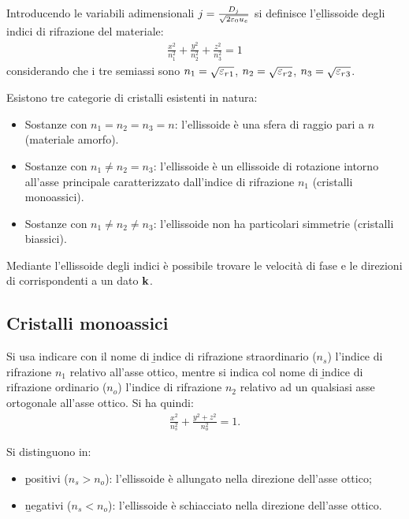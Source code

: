 Introducendo le variabili adimensionali $j=\frac{D_j}{\sqrt{2\varepsilon_0u_e}}$ si definisce l'\b{ellissoide degli indici di rifrazione del materiale}:
\begin{equation}\begin{split}
\frac{x^2}{n_1^2}+\frac{y^2}{n_2^2}+\frac{z^2}{n_3^2}=1
\end{split}\end{equation}
considerando che i tre semiassi sono $n_1=\sqrt{{\varepsilon_r}_1}$, $n_2=\sqrt{{\varepsilon_r}_2}$, $n_3=\sqrt{{\varepsilon_r}_3}$.

Esistono tre categorie di cristalli esistenti in natura:
\begin{itemize}
\item Sostanze con $n_1=n_2=n_3=n$: l'ellissoide è una sfera di raggio pari a $n$ (materiale amorfo).
\item Sostanze con $n_1\neq n_2=n_3$: l'ellissoide è un ellissoide di rotazione intorno all'asse principale caratterizzato dall'indice di rifrazione $n_1$ (cristalli monoassici).
\item Sostanze con $n_1\neq n_2\neq n_3$: l'ellissoide non ha particolari simmetrie (cristalli biassici).
\end{itemize}
Mediante l'ellissoide degli indici è possibile trovare le velocità di fase e le direzioni di \dD corrispondenti a un dato $\mathbf{k}$.

\subsection{Cristalli monoassici}
Si usa indicare con il nome di \b{indice di rifrazione straordinario} ($n_s$) l'indice di rifrazione $n_1$ relativo all'asse ottico, mentre si indica col nome di \b{indice di rifrazione ordinario} ($n_o$) l'indice di rifrazione $n_2$ relativo ad un qualsiasi asse ortogonale all'asse ottico. Si ha quindi:
\begin{equation}\begin{split}
\frac{x^2}{n_s^2}+\frac{y^2+z^2}{n_o^2}=1.
\end{split}\end{equation}

Si distinguono in:
\begin{itemize}
\item \b{positivi} ($n_s>n_o$): l'ellissoide è allungato nella direzione dell'asse ottico;
\item \b{negativi} ($n_s<n_o$): l'ellissoide è schiacciato nella direzione dell'asse ottico.
\end{itemize}

